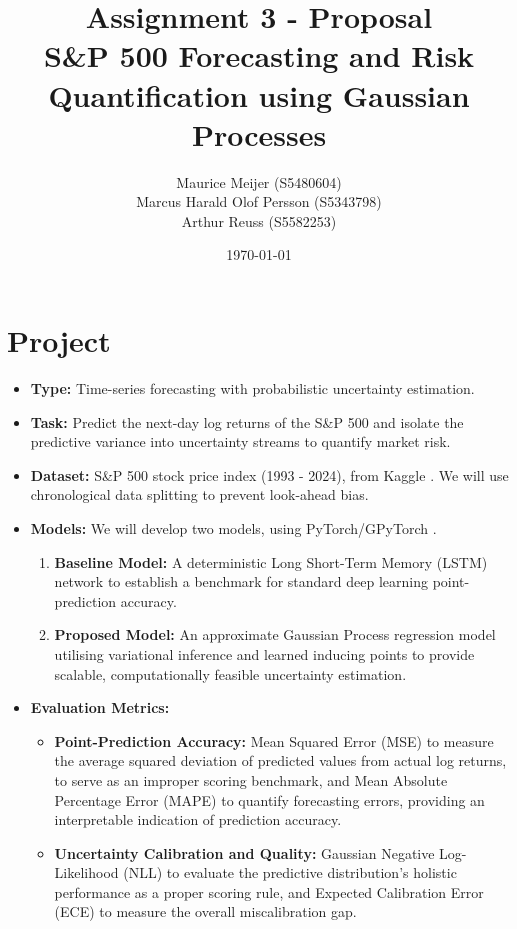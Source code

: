 \documentclass{article}
\title{Assignment 3 - Proposal\\
S\&P 500 Forecasting and Risk Quantification using Gaussian Processes}
\author{Maurice Meijer (S5480604) \\ Marcus Harald Olof Persson (S5343798) \\ Arthur Reuss (S5582253)}
\date{\today}
\begin{document}
\maketitle

\section*{Project}

\begin{itemize}
    \item \textbf{Type:} Time-series forecasting with probabilistic uncertainty estimation.
    \item \textbf{Task:} Predict the next-day log returns of the S\&P 500 and isolate the predictive variance into uncertainty streams to quantify market risk.
    \item \textbf{Dataset:} S\&P 500 stock price index (1993 - 2024), from Kaggle \cite{sp500}. We will use chronological data splitting to prevent look-ahead bias.
    \item \textbf{Models:} We will develop two models, using PyTorch/GPyTorch \cite{gardner2021gpytorchblackboxmatrixmatrixgaussian}.
    \begin{enumerate}
        \item \textbf{Baseline Model:} A deterministic Long Short-Term Memory (LSTM) network to establish a benchmark for standard deep learning point-prediction accuracy.
        \item \textbf{Proposed Model:} An approximate Gaussian Process regression model utilising variational inference and learned inducing points to provide scalable, computationally feasible uncertainty estimation.
    \end{enumerate}
    \item \textbf{Evaluation Metrics:}
    \begin{itemize}
        \item \textbf{Point-Prediction Accuracy:} Mean Squared Error (MSE) to measure the average squared deviation of predicted values from actual log returns, to serve as an improper scoring benchmark, and Mean Absolute Percentage Error (MAPE) to quantify forecasting errors, providing an interpretable indication of prediction accuracy.
        \item \textbf{Uncertainty Calibration and Quality:} Gaussian Negative Log-Likelihood (NLL) to evaluate the predictive distribution's holistic performance as a proper scoring rule, and Expected Calibration Error (ECE) to measure the overall miscalibration gap.
    \end{itemize}
\end{itemize}
\end{document}
